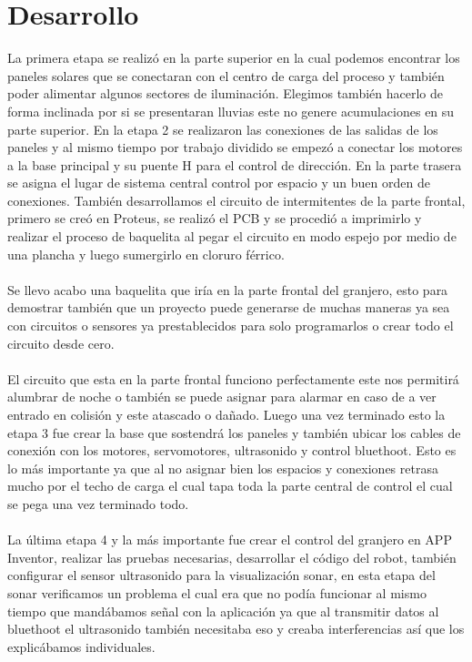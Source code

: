 \documentclass[11pt,a4paper]{article}
\begin{document}
\section{Desarrollo}
La primera etapa se realizó en la parte superior en la cual podemos encontrar los paneles solares que se conectaran con el centro de carga del proceso y también poder alimentar algunos sectores de iluminación.
Elegimos también hacerlo de forma inclinada por si se presentaran lluvias este no genere acumulaciones en su parte superior.
En la etapa 2 se realizaron las conexiones de las salidas de los paneles y al mismo tiempo por trabajo dividido se empezó a conectar los motores a la base principal y su puente H para el control de dirección. En la parte trasera se asigna el lugar de sistema central control por espacio y un buen orden de conexiones.
También desarrollamos el circuito de intermitentes de la parte frontal, primero se creó en Proteus, se realizó el PCB y se procedió a imprimirlo y realizar el proceso de baquelita al pegar el circuito en modo espejo por medio de una plancha y luego sumergirlo en cloruro férrico.\\\\
Se llevo acabo una baquelita que iría en la parte frontal del granjero, esto para demostrar también que un proyecto puede generarse de muchas maneras ya sea con circuitos o sensores ya prestablecidos para solo programarlos o crear todo el circuito desde cero.\\\\
El circuito que esta en la parte frontal funciono perfectamente este nos permitirá alumbrar de noche o también se puede asignar para alarmar en caso de a ver entrado en colisión y este atascado o dañado.
Luego una vez terminado esto la etapa 3 fue crear la base que sostendrá los paneles y también ubicar los cables de conexión con los motores, servomotores, ultrasonido y control bluethoot. Esto es lo más importante ya que al no asignar bien los espacios y conexiones retrasa mucho por el techo de carga el cual tapa toda la parte central de control el cual se pega una vez terminado todo.\\\\
La última etapa 4 y la más importante fue crear el control del granjero en APP Inventor, realizar las pruebas necesarias, desarrollar el código del robot, también configurar el sensor ultrasonido para la visualización sonar, en esta etapa del sonar verificamos un problema el cual era que no podía funcionar al mismo tiempo que mandábamos señal con la aplicación ya que al transmitir datos al bluethoot el ultrasonido también necesitaba eso y creaba interferencias así que los explicábamos individuales.\\\\
\end{document}
